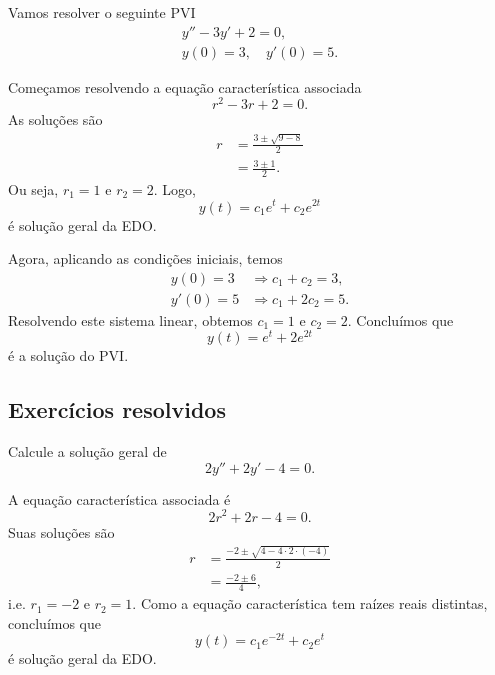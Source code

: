 \begin{ex}
  Vamos resolver o seguinte PVI
  \begin{align}
    y'' - 3y' + 2 = 0,\\
    y(0) = 3,\quad y'(0) = 5.
  \end{align}

  Começamos resolvendo a equação característica associada
  \begin{equation}
    r^2 -3r + 2 = 0.
  \end{equation}
  As soluções são
  \begin{align}
    r &= \frac{3 \pm \sqrt{9 - 8}}{2} \\
      &= \frac{3 \pm 1}{2}.
  \end{align}
  Ou seja, $r_1 = 1$ e $r_2 = 2$. Logo,
  \begin{equation}
    y(t) = c_1e^t + c_2e^{2t}
  \end{equation}
  é solução geral da EDO.

  Agora, aplicando as condições iniciais, temos
  \begin{align}
    y(0) = 3 &\Rightarrow c_1 + c_2 = 3,\\
    y'(0) = 5 &\Rightarrow c_1 + 2c_2 = 5.
  \end{align}
  Resolvendo este sistema linear, obtemos $c_1 = 1$ e $c_2 = 2$. Concluímos que
  \begin{equation}
    y(t) = e^t + 2e^{2t}
  \end{equation}
  é a solução do PVI.
\end{ex}

\subsection*{Exercícios resolvidos}

\begin{exeresol}
  Calcule a solução geral de
  \begin{equation}
    2y'' + 2y' - 4 = 0.
  \end{equation}
\end{exeresol}
\begin{resol}
  A equação característica associada é
  \begin{equation}
    2r^2 + 2r -4 = 0.
  \end{equation}
  Suas soluções são
  \begin{align}
    r &= \frac{-2 \pm \sqrt{4 - 4\cdot 2\cdot (-4)}}{2} \\
    &= \frac{-2 \pm 6}{4},
  \end{align}
  i.e. $r_1 = -2$ e $r_2 = 1$. Como a equação característica tem raízes reais distintas, concluímos que
  \begin{equation}
    y(t) = c_1e^{-2t} + c_2e^{t}
  \end{equation}
  é solução geral da EDO.
\end{resol}

